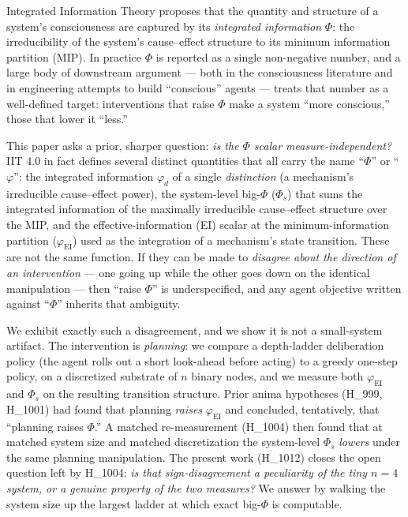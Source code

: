 \documentclass[11pt,a4paper]{article}
\newcommand{\faithful}{\ensuremath{\varphi_{\mathrm{EI}}}}
\newcommand{\bigphi}{\ensuremath{\Phi_{s}}}
\begin{document}
Integrated Information Theory \citep{tononi2016,albantakis2023iit4} proposes
that the quantity and structure of a system's consciousness are captured by
its \emph{integrated information} $\Phi$: the irreducibility of the system's
cause--effect structure to its minimum information partition (MIP). In
practice $\Phi$ is reported as a single non-negative number, and a large body
of downstream argument --- both in the consciousness literature and in
engineering attempts to build ``conscious'' agents --- treats that number as a
well-defined target: interventions that raise $\Phi$ make a system ``more
conscious,'' those that lower it ``less.''

This paper asks a prior, sharper question: \emph{is the $\Phi$ scalar
measure-independent?} IIT 4.0 in fact defines several distinct quantities that
all carry the name ``$\Phi$'' or ``$\varphi$'': the integrated information
$\varphi_d$ of a single \emph{distinction} (a mechanism's irreducible
cause--effect power), the system-level big-$\Phi$ ($\bigphi$) that sums the
integrated information of the maximally irreducible cause--effect structure
over the MIP, and the effective-information (EI) scalar at the
minimum-information partition (\faithful) used as the integration of a
mechanism's state transition. These are not the same function. If they can be
made to \emph{disagree about the direction of an intervention} --- one going up
while the other goes down on the identical manipulation --- then ``raise
$\Phi$'' is underspecified, and any agent objective written against ``$\Phi$''
inherits that ambiguity.

We exhibit exactly such a disagreement, and we show it is not a small-system
artifact. The intervention is \emph{planning}: we compare a depth-ladder
deliberation policy (the agent rolls out a short look-ahead before acting) to a
greedy one-step policy, on a discretized substrate of $n$ binary nodes, and we
measure both \faithful{} and \bigphi{} on the resulting transition structure.
Prior anima hypotheses (H\_999, H\_1001) had found that planning
\emph{raises} \faithful{} and concluded, tentatively, that ``planning raises
$\Phi$.'' A matched re-measurement (H\_1004) then found that at matched system
size and matched discretization the system-level \bigphi{} \emph{lowers} under
the same planning manipulation. The present work (H\_1012) closes the open
question left by H\_1004: \emph{is that sign-disagreement a peculiarity of the
tiny $n=4$ system, or a genuine property of the two measures?} We answer by
walking the system size up the largest ladder at which exact big-$\Phi$ is
computable.
\end{document}
